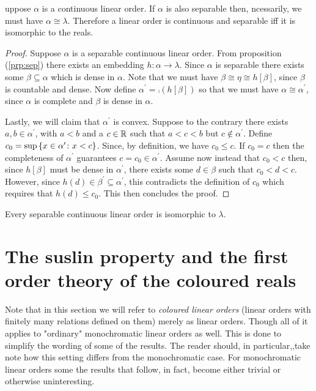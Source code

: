 \begin{thm}
	uppose $\alpha$ is a continuous linear order.  If $\alpha$ is also separable then, ncessarily, we must have $\alpha\cong\lambda$.  Therefore a linear order is continuous and separable iff it is isomorphic to the reals.
\end{thm}
\begin{proof}
	Suppose $\alpha$ is a separable continuous linear order.  From proposition (\ref{prp:sep}) there exists an embedding $h\colon\alpha\to\lambda$.  Since $\alpha$ is separable there exists some $\beta\subseteq\alpha$ which is dense in $\alpha$.  Note that we must have $\beta\cong\eta\cong h[\beta]$, since $\beta$ is countable and dense.  Now define $\alpha^\prime=\comp(h[\beta])$ so that we must have $\alpha\cong\alpha^\prime$, since $\alpha$ is complete and $\beta$ is dense in $\alpha$.

	Lastly, we will claim that $\alpha^\prime$ is convex.  Suppose to the contrary there exists $a,b\in\alpha^\prime$, with $a<b$ and a $c\in\mathbb{R}$ such that $a<c<b$ but $c\notin\alpha^\prime$.  Define $c_0=\sup\left\lbrace x\in\alpha^\prime\colon x<c \right\rbrace$. Since, by definition, we have $c_0\leq c$.  If $c_0=c$ then the completeness of $\alpha^\prime$ guarantees $c=c_0\in\alpha^\prime$.  Assume now instead that $c_0<c$ then, since $h[\beta]$ must be dense in $\alpha^\prime$, there exists some $d\in\beta$ such that $c_0<d<c$.  However, since $h(d)\in\beta^\prime\subseteq\alpha^\prime$, this contradicts the definition of $c_0$ which requires that $h(d)\leq c_0$.  This then concludes the proof.
\end{proof}

\begin{thm}\label{thm:rchar}
	Every separable continuous linear order is isomorphic to $\lambda$.
\end{thm}


\section{The  suslin property and the first order theory of the coloured reals}

Note that in this section we will refer to \textit{coloured linear orders} (linear orders with finitely many relations defined on them) merely as linear orders.  Though all of it applies to "ordinary" monochromatic linear orders as well.  This is done to simplify the wording of some of the results.  The reader should, in particular,,take note how this setting differs from the monochromatic case.  For monochromatic linear orders some the results that follow, in fact, become either trivial or otherwise uninteresting.

